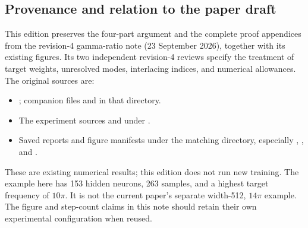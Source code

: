\documentclass[11pt]{article}
\begin{document}
\subsection{Provenance and relation to the paper draft}
This edition preserves the four-part argument and the complete proof appendices from the revision-4 gamma-ratio note (23 September 2026), together with its existing figures. Its two independent revision-4 reviews specify the treatment of target weights, unresolved modes, interlacing indices, and numerical allowances. The original sources are:
\begin{itemize}\raggedright
\item {}; companion files  and  in that directory.
\item The experiment sources  and  under .
\item Saved reports and figure manifests under the matching  directory, especially , , and .
\end{itemize}
These are existing numerical results; this edition does not run new training. The example here has 153 hidden neurons, 263 samples, and a highest target frequency of $10\pi$. It is not the current paper's separate width-512, $14\pi$ example. The figure and step-count claims in this note should retain their own experimental configuration when reused.
\end{document}
